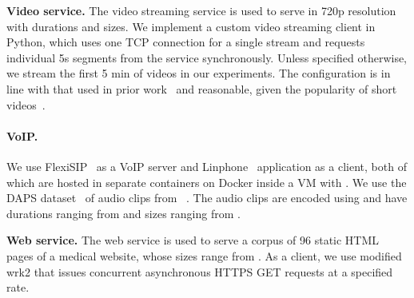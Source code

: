 \textbf{Video service.}
The video streaming service is used to serve  in 720p
resolution with  durations and
 sizes.
We implement a custom video streaming client in Python, which
uses one TCP connection for a single stream and requests individual 5s segments
from the service synchronously.
Unless specified otherwise, we stream the first 5 min of videos in our
experiments. The configuration is in line with that used in prior
work~\cite{schuster2017beautyburst} and reasonable, given the popularity of
short videos~\cite{videostats}.


\paragraph{VoIP.}
We use FlexiSIP~\cite{flexisip} as a VoIP server and
Linphone~\cite{linphone} application as a client, both of which are hosted in
separate containers on Docker  inside a VM with . We use the DAPS dataset~\cite{daps} of 
audio clips from ~\cite{audio-dataset}. The audio clips are
encoded using  and have durations ranging from  and sizes ranging from .
\fi

\textbf{Web service.}
The web service is used to serve a corpus of {96} static HTML pages of a medical
website, whose sizes range from .
{As a client, we use modified wrk2 \cite{wrk2} that issues concurrent
asynchronous HTTPS GET requests at a specified rate.}

